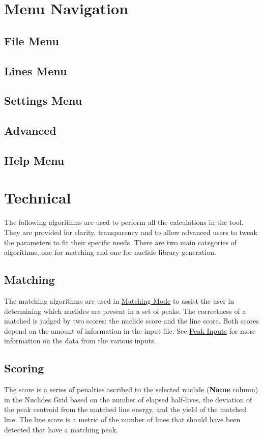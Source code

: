 \documentclass[12pt,report,justified]{SANDreport}
\begin{document}
    \chapter{Menu Navigation}\label{sec:menu}
      \section{File Menu}\label{sec:file_menu}
      \section{Lines Menu}\label{sec:line_menu}
      \section{Settings Menu}\label{sec:set_menu}
      \section{Advanced}\label{sec:adv_menu}
      \section{Help Menu}\label{sec:help_menu}

    \chapter{Technical}\label{sec:tech}
The following algorithms are used to perform all the calculations in the tool. They are provided
for clarity, transparency and to allow advanced users to tweak the parameters to fit their specific
needs. There are two main categories of algorithms, one for matching and one for nuclide library
generation.
      \section{Matching}\label{sec:match}
The matching algorithms are used in \hyperref[sec:match_mode]{Matching Mode} to assist the user in
determining which nuclides are present in a set of peaks. The correctness of a matched is judged by
two scores: the nuclide score and the line score. Both scores depend on the amount of information
in the input file. See \hyperref[sec:peak_inp]{Peak Inputs} for more information on the data from the
various inputs.

      \section{Scoring}\label{sec:score}
The score is a series of penalties ascribed to the selected nuclide (\textbf{Name} column) in the Nuclides
Grid based on the number of elapsed half-lives, the deviation of the peak centroid from the matched
line energy, and the yield of the matched line. The line score is a metric of the number of lines
that should have been detected that have a matching peak.
\end{document}
